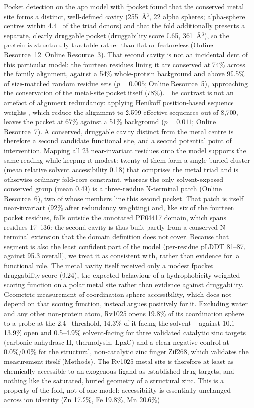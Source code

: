 \documentclass[11pt,a4paper]{article}
\newcommand{\ang}{\text{\AA}}
\begin{document}
Pocket detection on the apo model with fpocket found that the conserved metal site forms a distinct, well-defined cavity (255~\AA$^3$, 22 alpha spheres; alpha-sphere centres within 4.4~\ang{} of the triad donors) and that the fold additionally presents a separate, clearly druggable pocket (druggability score 0.65, 361~\AA$^3$), so the protein is structurally tractable rather than flat or featureless (Online Resource~12, Online Resource~3). That second cavity is not an incidental dent of this particular model: the fourteen residues lining it are conserved at 74\% across the family alignment, against a 54\% whole-protein background and above 99.5\% of size-matched random residue sets ($p=0.005$; Online Resource~5), approaching the conservation of the metal-site pocket itself (78\%). The contrast is not an artefact of alignment redundancy: applying Henikoff position-based sequence weights \citep{henikoff1994weights}, which reduce the alignment to 2{,}599 effective sequences out of 8{,}700, leaves the pocket at 67\% against a 51\% background ($p=0.011$; Online Resource~7). A conserved, druggable cavity distinct from the metal centre is therefore a second candidate functional site, and a second potential point of intervention. Mapping all 23 near-invariant residues onto the model supports the same reading while keeping it modest: twenty of them form a single buried cluster (mean relative solvent accessibility 0.18) that comprises the metal triad and is otherwise ordinary fold-core constraint, whereas the only solvent-exposed conserved group (mean 0.49) is a three-residue N-terminal patch (Online Resource~6), two of whose members line this second pocket. That patch is itself near-invariant (92\% after redundancy weighting) and, like six of the fourteen pocket residues, falls outside the annotated PF04417 domain, which spans residues 17--136: the second cavity is thus built partly from a conserved N-terminal extension that the domain definition does not cover. Because that segment is also the least confident part of the model (per-residue pLDDT 81--87, against 95.3 overall), we treat it as consistent with, rather than evidence for, a functional role. The metal cavity itself received only a modest fpocket druggability score (0.24), the expected behaviour of a hydrophobicity-weighted scoring function on a polar metal site rather than evidence against druggability. Geometric measurement of coordination-sphere accessibility, which does not depend on that scoring function, instead argues positively for it. Excluding water and any other non-protein atom, Rv1025 opens 19.8\% of its coordination sphere to a probe at the 2.4~\ang{} threshold, 14.3\% of it facing the solvent -- against 10.1--13.9\% open and 0.5--4.9\% solvent-facing for three validated catalytic zinc targets (carbonic anhydrase II, thermolysin, LpxC) and a clean negative control at 0.0\%/0.0\% for the structural, non-catalytic zinc finger Zif268, which validates the measurement itself (Methods). The Rv1025 metal site is therefore at least as chemically accessible to an exogenous ligand as established drug targets, and nothing like the saturated, buried geometry of a structural zinc. This is a property of the fold, not of one model: accessibility is essentially unchanged across ion identity (Zn 17.2\%, Fe 19.8\%, Mn 20.6\%) 
\end{document}
